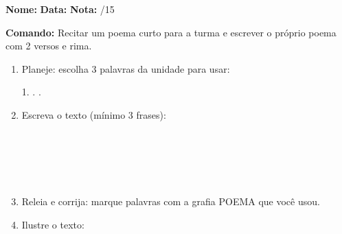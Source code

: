 

\begin{exercicio}

\noindent\textbf{Nome:} \underline{\hspace{3.2cm}} \quad \textbf{Data:} \underline{\hspace{1.6cm}} \quad \textbf{Nota:} \underline{\hspace{0.9cm}}/15


\noindent\textbf{Comando:} Recitar um poema curto para a turma e escrever o próprio poema com 2 versos e rima.


\begin{enumerate}

  \item Planeje: escolha 3 palavras da unidade para usar:
  \begin{center}
  1. \underline{\hspace{3cm}} . \underline{\hspace{3cm}} . \underline{\hspace{3cm}}
  \end{center}

  \item Escreva o texto (mínimo 3 frases):
  \begin{center}
  \underline{\hspace{12cm}}\\\underline{\hspace{12cm}}\\\underline{\hspace{12cm}}\\\underline{\hspace{12cm}}\\\underline{\hspace{12cm}}
  \end{center}

  \item Releia e corrija: marque palavras com a grafia POEMA que você usou.

  \item Ilustre o texto:
  \begin{center}
  \end{center}

\end{enumerate}

\end{exercicio}

